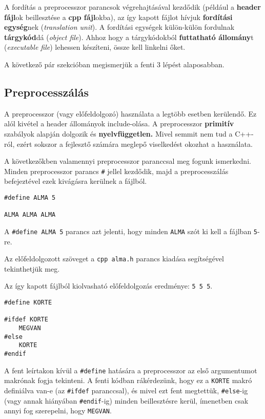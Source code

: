 \documentclass[a4paper,11.5pt]{article}
\begin{document}
	A fordítás a preprocesszor parancsok végrehajtásával kezdődik (például a \textbf{header fájl}ok beillesztése a \textbf{cpp fájl}okba), az így kapott fájlot hívjuk \textbf{fordítási egység}nek (\textit{translation unit}). A fordítási egységek külön-külön fordulnak \textbf{tárgykód}dá (\textit{object file}). Ahhoz hogy a tárgykódokból \textbf{futtatható állomány}t (\textit{executable file}) lehessen készíteni, össze kell linkelni őket.
	\medskip
	
	A következő pár szekcióban megismerjük a fenti 3 lépést alaposabban.
	
	\subsection{Preprocesszálás}
	A preprocesszor (vagy előfeldolgozó) használata a legtöbb esetben kerülendő. Ez alól kivétel a header állományok include-olása. A preprocesszor \textbf{primitív} szabályok alapján dolgozik és \textbf{nyelvfüggetlen.} Mivel semmit nem tud a C++-ról, ezért sokszor a fejlesztő számára meglepő viselkedést okozhat a használata.
	
	A következőkben valamennyi preprocesszor paranccsal meg fogunk ismerkedni. Minden preprocesszor parancs \texttt{\#} jellel kezdődik, majd a preprocesszálás befejeztével ezek kivágásra kerülnek a fájlból.
	\bigskip
	
	\begin{lstlisting}
#define ALMA 5

ALMA ALMA ALMA
	\end{lstlisting}
	A \texttt{\#define ALMA 5}  parancs azt jelenti, hogy minden \texttt{ALMA} szót ki kell a fájlban \texttt{5}-re.
	
	Az előfeldolgozott szöveget a \texttt{cpp alma.h} parancs kiadása segítségével tekinthetjük meg.
	
	Az így kapott fájlból kiolvasható előfeldolgozás eredménye: \texttt{5 5 5}.
	\bigskip
	
	\begin{lstlisting}
#define KORTE

#ifdef KORTE
	MEGVAN
#else
	KORTE
#endif
	\end{lstlisting}
	A fent leírtakon kívül a \texttt{\#define} hatására a preprocesszor az első argumentumot makrónak fogja tekinteni. A fenti kódban rákérdezünk, hogy ez a \texttt{KORTE} makró definiálva van-e (az \texttt{\#ifdef} paranccsal), és mivel ezt fent megtettük, \texttt{\#else}-ig (vagy annak hiányában \texttt{\#endif}-ig) minden beillesztésre kerül, ímenetben csak annyi fog szerepelni, hogy \texttt{MEGVAN}.
	\bigskip
	
\end{document}

